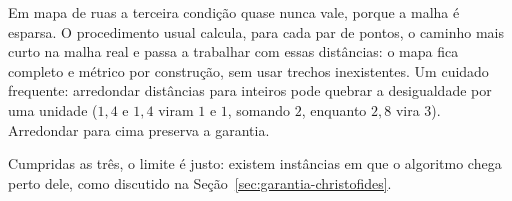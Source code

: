 Em mapa de ruas a terceira condição quase nunca vale, porque a malha é esparsa.
O procedimento usual calcula, para cada par de pontos, o caminho mais curto na
malha real e passa a trabalhar com essas distâncias: o mapa fica completo e
métrico por construção, sem usar trechos inexistentes. Um cuidado frequente:
arredondar distâncias para inteiros pode quebrar a desigualdade por uma unidade
($1{,}4$ e $1{,}4$ viram $1$ e $1$, somando $2$, enquanto $2{,}8$ vira $3$).
Arredondar para cima preserva a garantia.

Cumpridas as três, o limite é justo: existem instâncias em que o algoritmo chega
perto dele, como discutido na Seção~\ref{sec:garantia-christofides}.
